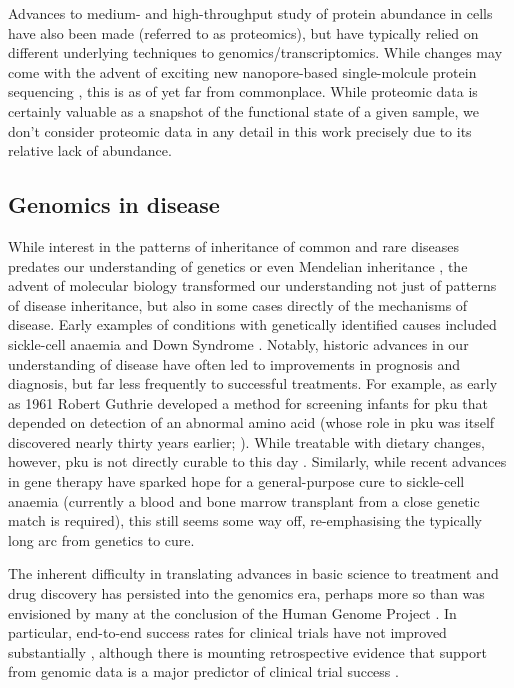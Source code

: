 \documentclass[thesis.tex]{subfiles}
\begin{document}
Advances to medium- and high-throughput study of protein abundance in cells have also been made (referred to as proteomics), but have typically relied on different underlying techniques to genomics/transcriptomics. While changes may come with the advent of exciting new nanopore-based single-molcule protein sequencing \citep{afshar_bakshloo_nanopore-based_2022, motone_not_2023}, this is as of yet far from commonplace. While proteomic data is certainly valuable as a snapshot of the functional state of a given sample, we don't consider proteomic data in any detail in this work precisely due to its relative lack of abundance. 


\subsection{Genomics in disease}
While interest in the patterns of inheritance of common and rare diseases predates our understanding of genetics or even Mendelian inheritance \citep{emery_joseph_1989}, the advent of molecular biology transformed our understanding not just of patterns of disease inheritance, but also in some cases directly of the mechanisms of disease. Early examples of conditions with genetically identified causes included sickle-cell anaemia \citep{ingram_specific_1956} and Down Syndrome \citep{lejeune_human_1959}. Notably, historic advances in our understanding of disease have often led to improvements in prognosis and diagnosis, but far less frequently to successful treatments. For example, as early as 1961 Robert Guthrie developed a method for screening infants for \gls{pku} that depended on detection of an abnormal amino acid (whose role in \gls{pku} was itself discovered nearly thirty years earlier; \citealp{folling_uber_1934}). While treatable with dietary changes, however, \gls{pku} is not directly curable to this day \citep{mohanty_century_2014}. Similarly, while recent advances in gene therapy have sparked hope for a general-purpose cure to sickle-cell anaemia (currently a blood and bone marrow transplant from a close genetic match is required), this still seems some way off, re-emphasising the typically long arc from genetics to cure.

The inherent difficulty in translating advances in basic science to treatment and drug discovery has persisted into the genomics era, perhaps more so than was envisioned by many at the conclusion of the Human Genome Project \citep[see, for example,][]{emilien_impact_2000}. In particular, end-to-end success rates for clinical trials have not improved substantially \citep{dowden_trends_2019}, although there is mounting retrospective evidence that support from genomic data is a major predictor of clinical trial success \citep{nelson_support_2015, king_are_2019}.
\end{document}
